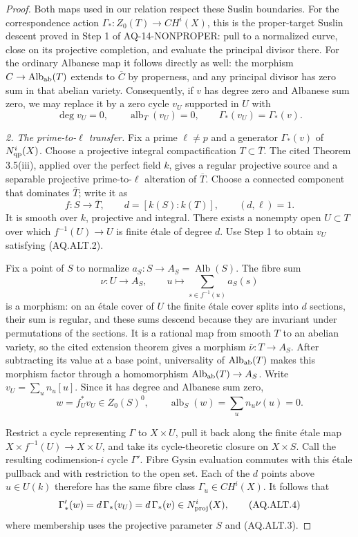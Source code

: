 \begin{proof}
Both maps used in our relation respect these Suslin
boundaries.  For the correspondence action
$\Gamma_*:Z_0(T)\to CH^i(X)$, this is the proper-target
Suslin descent proved in Step 1 of AQ-14-NONPROPER:
pull to a normalized curve, close on its projective
completion, and evaluate the principal divisor there.
For the ordinary Albanese map it follows directly as well:
the morphism $C\to\operatorname{Alb}_{\rm ab}(T)$
extends to $\overline C$ by properness, and any principal
divisor has zero sum in that abelian variety.
Consequently, if $v$ has degree zero and Albanese sum zero,
we may replace it by a zero cycle $v_U$ supported in $U$
with
\[
 \deg v_U=0,\qquad\operatorname{alb}_T(v_U)=0,
 \qquad \Gamma_*(v_U)=\Gamma_*(v).                \tag{AQ.ALT.2}
\]

\emph{2. The prime-to-$\ell$ transfer.}
Fix a prime $\ell\ne p$ and a generator
$\Gamma_*(v)$ of $N^i_{\rm qp}(X)$.
Choose a projective integral compactification
$T\subset\overline T$.
The cited Theorem 3.5(iii), applied over the perfect field
$k$, gives a regular projective source and a separable
projective prime-to-$\ell$ alteration of $\overline T$.
Choose a connected component that dominates
$\overline T$; write it as
\[
 f:S\longrightarrow\overline T,\qquad
 d=[k(S):k(T)],\qquad (d,\ell)=1.
\]
It is smooth over $k$, projective and integral.
There exists a nonempty open $U\subset T$ over which
$f^{-1}(U)\to U$ is finite \'etale of degree $d$.
Use Step 1 to obtain $v_U$ satisfying (AQ.ALT.2).

Fix a point of $S$ to normalize
$a_S:S\to A_S=\operatorname{Alb}(S)$.
The fibre sum
\[
 \nu:U\longrightarrow A_S,\qquad
 u\longmapsto\sum_{s\in f^{-1}(u)}a_S(s)
\]
is a morphism: on an \'etale cover of $U$ the finite
\'etale cover splits into $d$ sections, their sum is
regular, and these sums descend because they are
invariant under permutations of the sections.
It is a rational map from smooth $T$ to an abelian
variety, so the cited extension theorem gives a morphism
$\overline\nu:T\to A_S$.
After subtracting its value at a base point, universality
of $\operatorname{Alb}_{\rm ab}(T)$ makes this morphism
factor through a homomorphism
$\operatorname{Alb}_{\rm ab}(T)\to A_S$.
Write $v_U=\sum_u n_u[u]$.  Since it has degree and Albanese sum zero,
\[
 w=f_U^*v_U\in Z_0(S)^0,
 \qquad \operatorname{alb}_S(w)
        =\sum_u n_u\nu(u)=0.                       \tag{AQ.ALT.3}
\]

Restrict a cycle representing $\Gamma$ to $X\times U$,
pull it back along the finite \'etale map
$X\times f^{-1}(U)\to X\times U$, and take its
cycle-theoretic closure on $X\times S$.
Call the resulting codimension-$i$ cycle $\Gamma'$.
Fibre Gysin evaluation commutes with this \'etale
pullback and with restriction to the open set.
Each of the $d$ points above $u\in U(k)$ therefore
has the same fibre class $\Gamma_u\in CH^i(X)$.
It follows that
\[
 \Gamma'_*(w)=d\,\Gamma_*(v_U)
             =d\,\Gamma_*(v)
             \in N^i_{\rm proj}(X),               \tag{AQ.ALT.4}
\]
where membership uses the projective parameter $S$
and (AQ.ALT.3).


\end{proof}
